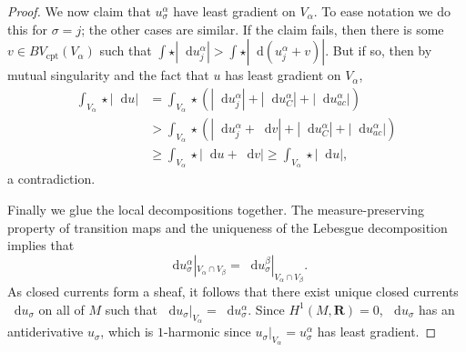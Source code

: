 \documentclass[reqno,11pt]{amsart}
\newcommand{\RR}{\mathbf{R}}
\newcommand*\dif{\mathop{}\!\mathrm{d}}
\newcommand{\dfn}[1]{\emph{#1}\index{#1}}
\newcommand{\cpt}{\mathrm{cpt}}
\theoremstyle{definition}
\newtheorem{definition}[theorem]{Definition}
\numberwithin{equation}{section}
\begin{document}
\begin{proof}
We now claim that $u^\alpha_\sigma$ have least gradient on $V_\alpha$.
To ease notation we do this for $\sigma = j$; the other cases are similar.
If the claim fails, then there is some $v \in BV_\cpt(V_\alpha)$ such that $\int \star |\dif u^\alpha_j| > \int \star |\dif (u^\alpha_j + v)|$.
But if so, then by mutual singularity and the fact that $u$ has least gradient on $V_\alpha$,
\begin{align*}
\int_{V_\alpha} \star |\dif u| &= \int_{V_\alpha} \star (|\dif u^\alpha_j| + |\dif u^\alpha_C| + |\dif u^\alpha_{ac}|) \\
&>  \int_{V_\alpha} \star (|\dif u^\alpha_j + \dif v| + |\dif u^\alpha_C| + |\dif u^\alpha_{ac}|) \\
&\geq \int_{V_\alpha} \star |\dif u + \dif v| \geq \int_{V_\alpha} \star |\dif u|,
\end{align*}
a contradiction.

Finally we glue the local decompositions together.
The measure-preserving property of transition maps and the uniqueness of the Lebesgue decomposition implies that
$$\dif u^\alpha_\sigma|_{V_\alpha \cap V_\beta} = \dif u^\beta_\sigma|_{V_\alpha \cap V_\beta}.$$
As closed currents form a sheaf, it follows that there exist unique closed currents $\dif u_\sigma$ on all of $M$ such that $\dif u_\sigma|_{V_\alpha} = \dif u^\alpha_\sigma$.
Since $H^1(M, \RR) = 0$, $\dif u_\sigma$ has an antiderivative $u_\sigma$, which is $1$-harmonic since $u_\sigma|_{V_\alpha} = u_\sigma^\alpha$ has least gradient.
\end{proof}


\end{document}
